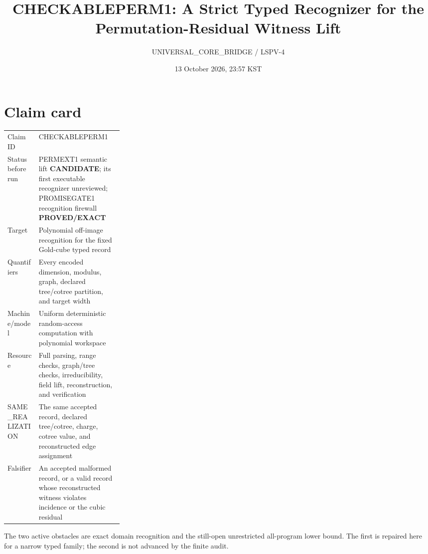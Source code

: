 \documentclass[11pt]{article}
\title{CHECKABLEPERM1: A Strict Typed Recognizer for the\\Permutation-Residual Witness Lift}
\author{UNIVERSAL\_CORE\_BRIDGE / LSPV-4}
\date{13 October 2026, 23:57 KST}
\newcommand{\EXACT}{\textbf{PROVED/EXACT}}
\newcommand{\CAND}{\textbf{CANDIDATE}}
\begin{document}
\maketitle

\begin{center}
\end{center}

\section{Claim card}
\begin{tabularx}{\linewidth}{p{0.27\linewidth}X}
\toprule
Claim ID & CHECKABLEPERM1 \\
Status before run & PERMEXT1 semantic lift \CAND; its first executable recognizer unreviewed; PROMISEGATE1 recognition firewall \EXACT \\
Target & Polynomial off-image recognition for the fixed Gold-cube typed record \\
Quantifiers & Every encoded dimension, modulus, graph, declared tree/cotree partition, and target width \\
Machine/model & Uniform deterministic random-access computation with polynomial workspace \\
Resource & Full parsing, range checks, graph/tree checks, irreducibility, field lift, reconstruction, and verification \\
SAME\_REALIZATION & The same accepted record, declared tree/cotree, charge, cotree value, and reconstructed edge assignment \\
Falsifier & An accepted malformed record, or a valid record whose reconstructed witness violates incidence or the cubic residual \\
\bottomrule
\end{tabularx}

The two active obstacles are exact domain recognition and the still-open
unrestricted all-program lower bound.  The first is repaired here for a narrow
typed family; the second is not advanced by the finite audit.
\end{document}
